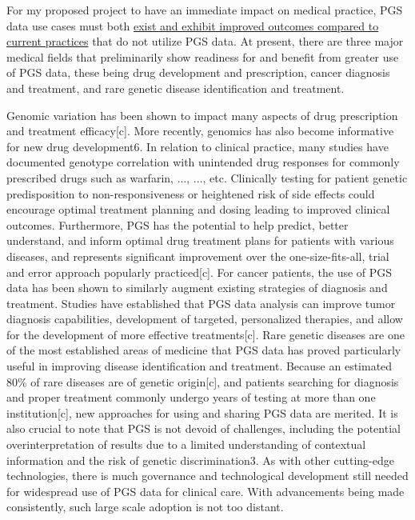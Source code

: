 \documentclass{article}
\begin{document}
For my proposed project to have an immediate impact on medical practice, PGS data use cases must both \underline{exist and exhibit improved outcomes compared to current practices} that do not utilize PGS data. At present, there are three major medical fields that preliminarily show readiness for and benefit from greater use of PGS data, these being drug development and prescription, cancer diagnosis and treatment, and rare genetic disease identification and treatment.

Genomic variation has been shown to impact many aspects of drug prescription and treatment efficacy[c]. More recently, genomics has also become informative for new drug development6. In relation to clinical practice, many studies have documented genotype correlation with unintended drug responses for commonly prescribed drugs such as warfarin, ..., ..., etc. Clinically testing for patient genetic predisposition to non-responsiveness or heightened risk of side effects could encourage optimal treatment planning and dosing leading to improved clinical outcomes. Furthermore, PGS has the potential to help predict, better understand, and inform optimal drug treatment plans for patients with various diseases, and represents significant improvement over the one-size-fits-all, trial and error approach popularly practiced[c]. For cancer patients, the use of PGS data has been shown to similarly augment existing strategies of diagnosis and treatment. Studies have established that PGS data analysis can improve tumor diagnosis capabilities, development of targeted, personalized therapies, and allow for the development of more effective treatments[c]. Rare genetic diseases are one of the most established areas of medicine that PGS data has proved particularly useful in improving disease identification and treatment. Because an estimated 80\% of rare diseases are of genetic origin[c], and patients searching for diagnosis and proper treatment commonly undergo years of testing at more than one institution[c], new approaches for using and sharing PGS data are merited. It is also crucial to note that PGS is not devoid of challenges, including the potential overinterpretation of results due to a limited understanding of contextual information and the risk of genetic discrimination3. As with other cutting-edge technologies, there is much governance and technological development still needed for widespread use of PGS data for clinical care. With advancements being made consistently, such large scale adoption is not too distant.
\end{document}
